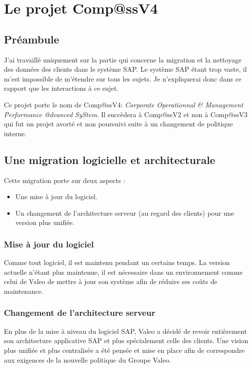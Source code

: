 \section{Le projet Comp@ssV4}

\subsection*{Préambule}

J'ai travaillé uniquement sur la partie qui concerne la migration et la nettoyage des données des clients dans le système SAP.
Le système SAP étant trop vaste, il m'est impossible de m'étendre sur tous les sujets. Je n'expliquerai donc dans ce rapport que les interactions à ce sujet.

Ce projet porte le nom de Comp@ssV4: \emph{Corporate Operationnal \& Management Performance @dvanced SyStem}.
Il succèdera à Comp@ssV2 et non à Comp@ssV3 qui fut un projet avorté et non poursuivi suite à un changement de politique interne.

\subsection{Une migration logicielle et architecturale}

Cette migration porte sur deux aspects :

\begin{itemize}
	\item Une mise à jour du logiciel.
	\item Un changement de l'architecture serveur (au regard des clients) pour une version plus unifiée.
\end{itemize}

\subsubsection{Mise à jour du logiciel}

Comme tout logiciel, il est maintenu pendant un certains temps. La version actuelle n'étant plus maintenue, il est nécessaire dans un environnement comme celui de Valeo de mettre à jour son système afin de réduire ses coûts de maintenance.

\subsubsection{Changement de l'architecture serveur}

En plus de la mise à niveau du logiciel SAP, Valeo a décidé de revoir entièrement son architecture applicative SAP et plus spécialement celle des clients.
Une vision plus unifiée et plus centralisée a été pensée et mise en place afin de correspondre aux exigences de la nouvelle politique du Groupe Valeo.
\clearpage

